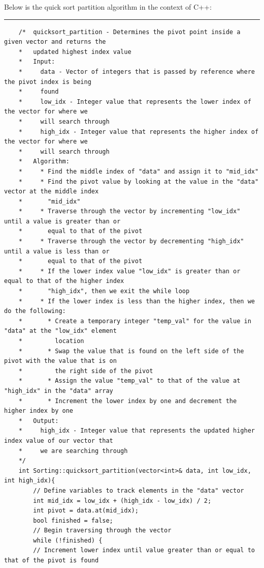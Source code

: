 \documentclass[a4paper,9pt]{article}
\newcommand{\horizontalline}{\noindent \rule{\textwidth}{0.5pt}\par}
\begin{document}
\begin{highlight}

    Below is the quick sort partition algorithm in the context of C++:

    \horizontalline

    \begin{verbatim}
    /*  quicksort_partition - Determines the pivot point inside a given vector and returns the 
    *   updated highest index value
    *   Input:
    *     data - Vector of integers that is passed by reference where the pivot index is being 
    *     found
    *     low_idx - Integer value that represents the lower index of the vector for where we 
    *     will search through
    *     high_idx - Integer value that represents the higher index of the vector for where we 
    *     will search through
    *   Algorithm:
    *     * Find the middle index of "data" and assign it to "mid_idx"
    *     * Find the pivot value by looking at the value in the "data" vector at the middle index 
    *       "mid_idx"
    *     * Traverse through the vector by incrementing "low_idx" until a value is greater than or 
    *       equal to that of the pivot
    *     * Traverse through the vector by decrementing "high_idx" until a value is less than or 
    *       equal to that of the pivot
    *     * If the lower index value "low_idx" is greater than or equal to that of the higher index 
    *       "high_idx", then we exit the while loop
    *     * If the lower index is less than the higher index, then we do the following:
    *       * Create a temporary integer "temp_val" for the value in "data" at the "low_idx" element 
    *         location
    *       * Swap the value that is found on the left side of the pivot with the value that is on 
    *         the right side of the pivot
    *       * Assign the value "temp_val" to that of the value at "high_idx" in the "data" array
    *       * Increment the lower index by one and decrement the higher index by one
    *   Output:
    *     high_idx - Integer value that represents the updated higher index value of our vector that 
    *     we are searching through
    */
    int Sorting::quicksort_partition(vector<int>& data, int low_idx, int high_idx){
        // Define variables to track elements in the "data" vector
        int mid_idx = low_idx + (high_idx - low_idx) / 2;
        int pivot = data.at(mid_idx);
        bool finished = false;
        // Begin traversing through the vector
        while (!finished) {
        // Increment lower index until value greater than or equal to that of the pivot is found

\end{verbatim}
\end{highlight}
\end{document}
